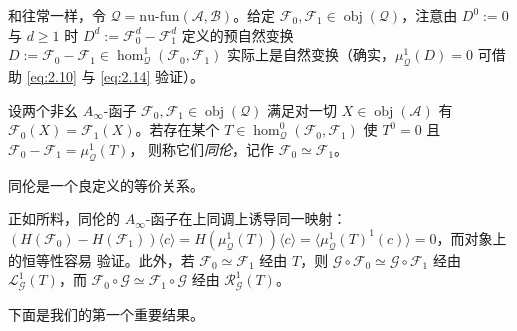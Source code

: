 和往常一样，令 $\mathcal Q=\mathrm{nu\text{-}fun}(\mathcal A,\mathcal B)$。给定
$\mathcal F_0,\mathcal F_1\in\operatorname{obj}(\mathcal Q)$，注意由 $D^0:=0$ 与
$d\ge 1$ 时 $D^d:=\mathcal F_0^d-\mathcal F_1^d$ 定义的预自然变换
$D:=\mathcal F_0-\mathcal F_1\in\hom^1_{\mathcal Q}(\mathcal F_0,\mathcal F_1)$
实际上是自然变换（确实，$\mu^1_{\mathcal Q}(D)=0$ 可借助 \eqref{eq:2.10} 与
\eqref{eq:2.14} 验证）。

\begin{Def}\label{def:2.17}
设两个非幺 $A_\infty$-函子 $\mathcal F_0,\mathcal F_1\in\operatorname{obj}
(\mathcal Q)$ 满足对一切 $X\in\operatorname{obj}(\mathcal A)$ 有
$\mathcal F_0(X)=\mathcal F_1(X)$。若存在某个 $T\in\hom^0_{\mathcal Q}(\mathcal F_0,
\mathcal F_1)$ 使 $T^0=0$ 且 $\mathcal F_0-\mathcal F_1=\mu^1_{\mathcal Q}(T)$，
则称它们\emph{同伦}，记作 $\mathcal F_0\simeq\mathcal F_1$。
\end{Def}

同伦是一个良定义的等价关系。

正如所料，同伦的 $A_\infty$-函子在上同调上诱导同一映射：
$(H(\mathcal F_0)-H(\mathcal F_1))\langle c\rangle=H(\mu^1_{\mathcal Q}(T))
\langle c\rangle=\langle\mu^1_{\mathcal Q}(T)^1(c)\rangle=0$，而对象上的恒等性容易
验证。此外，若 $\mathcal F_0\simeq\mathcal F_1$ 经由 $T$，则
$\mathcal G\circ\mathcal F_0\simeq\mathcal G\circ\mathcal F_1$ 经由
$\mathcal L^1_{\mathcal G}(T)$，而 $\mathcal F_0\circ\mathcal G\simeq
\mathcal F_1\circ\mathcal G$ 经由 $\mathcal R^1_{\mathcal G}(T)$。

下面是我们的第一个重要结果。

